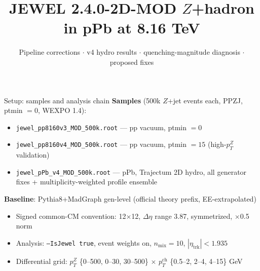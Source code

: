 \documentclass[aspectratio=169]{beamer}
\title{JEWEL 2.4.0-2D-MOD $Z$+hadron in pPb at 8.16 TeV}
\subtitle{Pipeline corrections $\cdot$ v4 hydro results $\cdot$ quenching-magnitude diagnosis $\cdot$ proposed fixes}
\date{}
\begin{document}
\begin{frame}
  \titlepage
\end{frame}

\begin{frame}[t]{Setup: samples and analysis chain}
  \textbf{Samples} (500k $Z$+jet events each, PPZJ, ptmin $=0$, WEXPO 1.4):
  \begin{itemize}
    \item \texttt{jewel\_pp8160v3\_MOD\_500k.root} --- pp vacuum, ptmin $=0$
    \item \texttt{jewel\_pp8160v4\_MOD\_500k.root} --- pp vacuum, ptmin $=15$ (high-$p_T^Z$ validation)
    \item \texttt{jewel\_pPb\_v4\_MOD\_500k.root} --- pPb, Trajectum 2D hydro, all generator fixes + multiplicity-weighted profile ensemble
  \end{itemize}
  \vspace{0.5em}
  \textbf{Baseline}: Pythia8+MadGraph gen-level (official theory prefix, EE-extrapolated)
  \vspace{0.5em}
  \begin{itemize}
    \item Signed common-CM convention: 12$\times$12, $\Delta\eta$ range 3.87, symmetrized, $\times$0.5 norm
    \item Analysis: \texttt{--IsJewel true}, event weights on, $n_\mathrm{mix}=10$, $|\eta_\mathrm{trk}|<1.935$
    \item Differential grid: $p_T^Z$ \{0--500, 0--30, 30--500\} $\times$ $p_T^\mathrm{ch}$ \{0.5--2, 2--4, 4--15\} GeV
  \end{itemize}
\end{frame}
\end{document}
